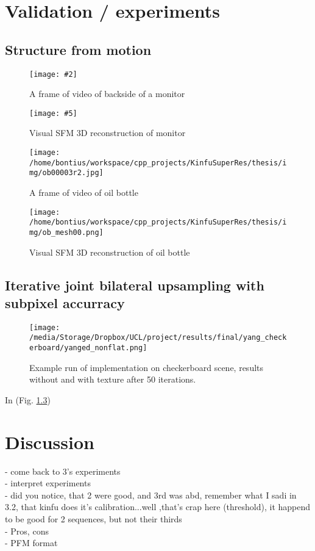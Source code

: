 \documentclass{ucl_thesis}
\newcommand{\myfig}[6]{%
\begin{figure}[h!]\centering%
	\begin{minipage}[b]{0.49\linewidth}\centering%
		\texttt{[image: \#2]}%
		\caption{#3}%
		\label{fig:#1}%
	\end{minipage}%
	\begin{minipage}[b]{0.49\linewidth}\centering%
		\texttt{[image: \#5]}%
		\caption{#6}%
		\label{fig:#4}%
	\end{minipage}%
\end{figure}%
}
\newcommand{\figref}[1]{(Fig. \ref{#1})}
\begin{document}
\chapter{Validation / experiments}
\label{chp:validation}

\section{Structure from motion} 
\label{sec:sfm}

\myfig
{acerlit_1}
{/home/bontius/workspace/cpp_projects/KinfuSuperRes/thesis/img/acer_lit00706.jpg}
{A frame of video of backside of a monitor}
{acerlit_mesh}
{/home/bontius/workspace/cpp_projects/KinfuSuperRes/thesis/img/acer_lit01.png}
{Visual SFM 3D reconstruction of monitor} 

\begin{figure}[h!]\centering
	\begin{minipage}[b]{0.49\linewidth}\centering
		\texttt{[image: /home/bontius/workspace/cpp\_projects/KinfuSuperRes/thesis/img/ob00003r2.jpg]}
		\caption{A frame of video of oil bottle}
		\label{fig:ob_1}
	\end{minipage}
	\begin{minipage}[b]{0.49\linewidth}\centering
		\texttt{[image: /home/bontius/workspace/cpp\_projects/KinfuSuperRes/thesis/img/ob\_mesh00.png]}
		\caption{Visual SFM 3D reconstruction of oil bottle}
		\label{fig:ob_mesh}
	\end{minipage}
\end{figure}

\section{Iterative joint bilateral upsampling with subpixel accurracy}
\label{sec:yang}

\begin{figure}[h!]\centering 
        \texttt{[image: /media/Storage/Dropbox/UCL/project/results/final/yang\_checkerboard/yanged\_nonflat.png]}        
        \caption{Example run of implementation on checkerboard scene, results without and with texture after 50 iterations.}
        \label{fig:yang_checkerboard}
\end{figure}

In \figref{fig:yang_checkerboard} 



\chapter{Discussion} \label{chp:discussion}
    - come back to 3's experiments\\
    - interpret experiments\\
    - did you notice, that 2 were good, and 3rd was abd, remember what I sadi in 3.2, that kinfu does it's calibration...well ,that's crap here (threshold), it happend to be good for 2 sequences, but not their thirds \\
-     Pros, cons \\
- PFM format \\
\end{document}
